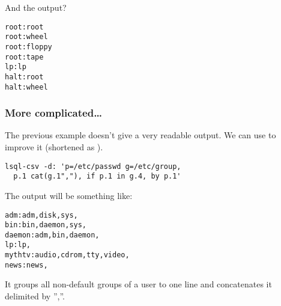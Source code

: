 And the output?
\begin{verbatim}
root:root                                                                                                                                                                                                                                                                 
root:wheel                                                                                                                                                                                                                                                                
root:floppy                                                                                                                                                                                                                                                               
root:tape                                                                                                                                                                                                                                                                 
lp:lp                                                                                                                                                                                                                                                                     
halt:root                                                                                                                                                                                                                                                                 
halt:wheel 
\end{verbatim}

\subsubsection{More complicated\ldots}
The previous example doesn't give a very readable output. We can use  to improve it (shortened as ).
\begin{verbatim}
lsql-csv -d: 'p=/etc/passwd g=/etc/group, 
  p.1 cat(g.1","), if p.1 in g.4, by p.1'
\end{verbatim}
The output will be something like:
\begin{verbatim}
adm:adm,disk,sys,
bin:bin,daemon,sys,
daemon:adm,bin,daemon,
lp:lp,
mythtv:audio,cdrom,tty,video,
news:news,
\end{verbatim}
It groups all non-default groups of a user to one line and concatenates it delimited by '',''.

